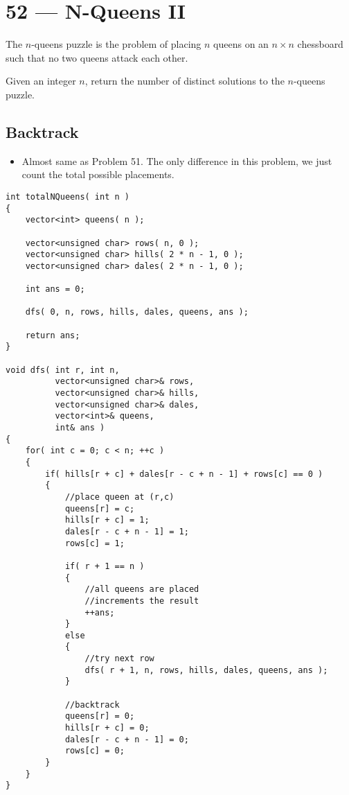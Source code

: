 \section{52 --- N-Queens II}
The $n$-queens puzzle is the problem of placing $n$ queens on an $n\times n$ chessboard such that no two queens attack each other.

Given an integer $n$, return the number of distinct solutions to the $n$-queens puzzle.

\subsection{Backtrack}

\begin{itemize}
\item Almost same as Problem 51. The only difference in this problem, we just count the total possible placements.
\end{itemize}

\setcounter{lstlisting}{0}
\begin{lstlisting}[style=customc, caption={Backtrack}]
int totalNQueens( int n )
{
    vector<int> queens( n );

    vector<unsigned char> rows( n, 0 );
    vector<unsigned char> hills( 2 * n - 1, 0 );
    vector<unsigned char> dales( 2 * n - 1, 0 );

    int ans = 0;

    dfs( 0, n, rows, hills, dales, queens, ans );

    return ans;
}

void dfs( int r, int n,
          vector<unsigned char>& rows,
          vector<unsigned char>& hills,
          vector<unsigned char>& dales,
          vector<int>& queens,
          int& ans )
{
    for( int c = 0; c < n; ++c )
    {
        if( hills[r + c] + dales[r - c + n - 1] + rows[c] == 0 )
        {
            //place queen at (r,c)
            queens[r] = c;
            hills[r + c] = 1;
            dales[r - c + n - 1] = 1;
            rows[c] = 1;

            if( r + 1 == n )
            {
                //all queens are placed
                //increments the result
                ++ans;
            }
            else
            {
                //try next row
                dfs( r + 1, n, rows, hills, dales, queens, ans );
            }

            //backtrack
            queens[r] = 0;
            hills[r + c] = 0;
            dales[r - c + n - 1] = 0;
            rows[c] = 0;
        }
    }
}
\end{lstlisting}
